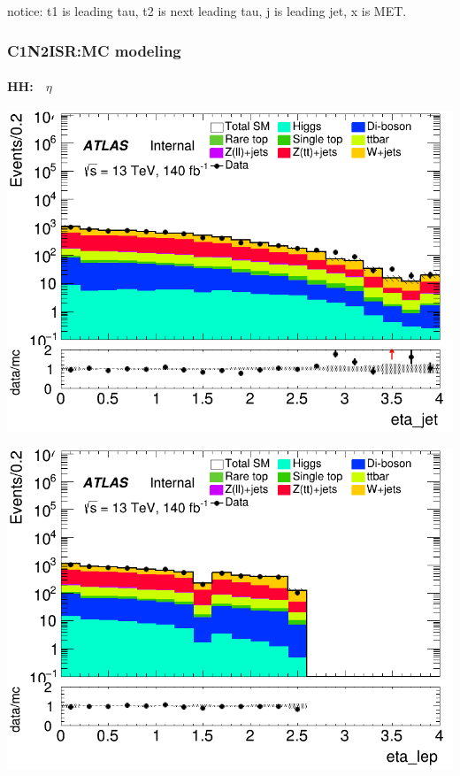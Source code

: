 \documentclass[usenames,dvipsnames]{beamer}
\begin{document}
\begin{frame}
\begin{minipage}{0.32\textwidth}
    \end{minipage}
    notice: t1 is leading tau, t2 is next leading tau, j is leading jet, x is MET.
\end{frame}

\begin{frame}
\frametitle{C1N2ISR:MC modeling}
\framesubtitle{HH:$\quad\eta$}
    \begin{minipage}{0.32\textwidth}
        \centering
        \includegraphics[width=\textwidth]{graphics/HH_met/HH_met_eta_jet.png}
    \end{minipage}
    \hfill
    \begin{minipage}{0.32\textwidth}
        \centering
        \includegraphics[width=\textwidth]{graphics/HH_met/HH_met_eta_lep.png}
    \end{minipage}

\end{frame}
\end{document}
